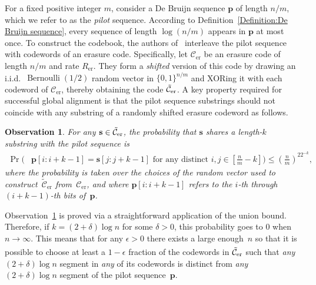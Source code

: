 \documentclass[journal,letterpaper,onecolumn,11pt]{IEEEtran}
\newcommand{\cC}{\mathcal{C}}
\newtheorem{observation}{Observation}
\begin{document}
For a fixed positive integer $m$, consider a De Bruijn sequence $\mathbf{p}$ of length $n/m$, which we refer to as the \emph{pilot} sequence. 
According to Definition~\ref{Definition:De Bruijn sequence}, every sequence of length $\log(n/m)$ appears in $\mathbf{p}$ at most once.
To construct the codebook, the authors of~\cite{shomorony2021torn} interleave the pilot sequence with codewords of an erasure code. 
Specifically, let $\cC_{\mathrm{er}}$ be an erasure code of length $n/m$ and rate $R_{\mathrm{er}}$. They form a \emph{shifted} version of this code by drawing an i.i.d.\ $\operatorname{Bernoulli}(1/2)$ random vector in $\{0,1\}^{n/m}$ and XORing it with each codeword of $\cC_{\mathrm{er}}$, thereby obtaining the code $\Tilde{\cC}_{\mathrm{er}}$.
A key property required for successful global alignment is that the pilot sequence substrings should not coincide with any substring of a randomly shifted erasure codeword as follows.
\begin{observation}\label{Lemma: probability of match in ilan's method}
    For any $\mathbf{s} \in \Tilde{\cC}_{\mathrm{er}}$, the probability that $\mathbf{s}$ shares a length-$k$ substring with the pilot sequence is
\begin{align*}
    \Pr\Big(&\mathbf{p}[i:i+k-1]=\mathbf{s}[j:j+k-1] \text{ for any distinct }i,j\in[\tfrac{n}{m}-k]
    \Big) \leq (\tfrac{n}{m})^22^{-k},
\end{align*} 
where the probability is taken over the choices of the random vector used to construct~$\tilde{\cC}_\text{er}$ from~$\cC_\text{er}$, and where $\mathbf{p}[i:i+k-1]$ refers to the $i$-th through $(i+k-1)$-th bits of~$\mathbf{p}$.
\end{observation}

Observation~\ref{Lemma: probability of match in ilan's method} is proved via a straightforward application of the union bound. 
Therefore, if $k=(2+\delta)\log n$ for some $\delta>0$, this probability goes to $0$ when $n\xrightarrow[]{}\infty$. 
This means that for any $\epsilon>0$ there exists a large enough~$n$ so that it is possible to choose at least a $1-\epsilon$ fraction of the codewords in $\Tilde{\cC}_{\mathrm{er}}$ such that \textit{any} $(2+\delta)\log n$ segment in \textit{any} of its codewords is distinct from \textit{any} $(2+\delta)\log n$ segment of the pilot sequence~$\mathbf{p}$.
\end{document}
